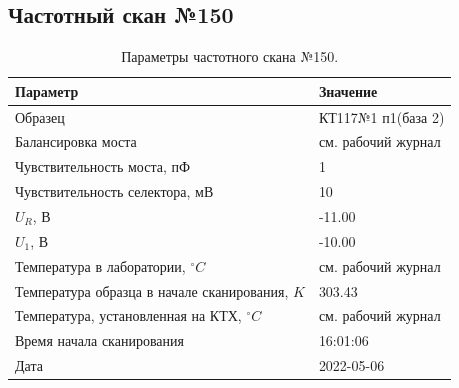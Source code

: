 \subsection{Частотный скан №150}
\begin{table}[!ht]
    \centering
    \caption{Параметры частотного скана №150.}
    \begin{tabular}{|l|l|}
        \hline
        Параметр                                       & Значение                  \\ \hline
        Образец                                        & КТ117№1 п1(база 2)        \\ \hline
        Балансировка моста                             & см. рабочий журнал        \\ \hline
        Чувствительность моста, пФ                     & 1                         \\ \hline
        Чувствительность селектора, мВ                 & 10                        \\ \hline
        $U_R$, В                                       & -11.00                    \\ \hline
        $U_1$, В                                       & -10.00                    \\ \hline
        Температура в лаборатории, $^\circ C$          & см. рабочий журнал        \\ \hline
        Температура образца в начале сканирования, $K$ & 303.43                    \\ \hline
        Температура, установленная на КТХ, $^\circ C$  & см. рабочий журнал        \\ \hline
        Время начала сканирования                      & 16:01:06                  \\ \hline
        Дата                                           & 2022-05-06                \\ \hline
    \end{tabular}
    \label{table:frequency_scan_150}
\end{table}

